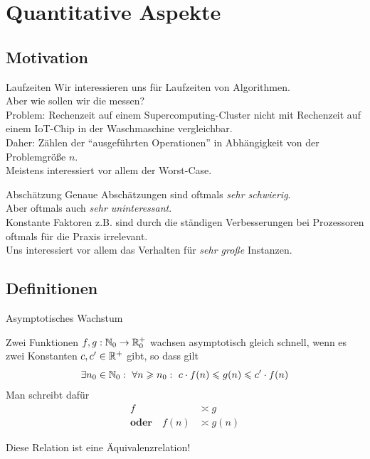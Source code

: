 \section{Quantitative Aspekte}


\subsection{Motivation}
\begin{frame}{Laufzeiten}
	Wir interessieren uns für Laufzeiten von Algorithmen.\\
	Aber wie sollen wir die messen?\\ \pause
	Problem: Rechenzeit auf einem Supercomputing-Cluster nicht mit Rechenzeit auf einem IoT-Chip in der Waschmaschine vergleichbar.\\
	
	\bigskip \pause
	Daher: Zählen der \enquote{ausgeführten Operationen} in Abhängigkeit von der Problemgröße $n$.\\
	Meistens interessiert vor allem der Worst-Case.
\end{frame}

\begin{frame}{Abschätzung}
	Genaue Abschätzungen sind oftmals \textit{sehr schwierig}.\\
	Aber oftmals auch \textit{sehr uninteressant}.\\
	Konstante Faktoren z.B. sind durch die ständigen Verbesserungen bei Prozessoren oftmals für die Praxis irrelevant.\\
	
	\bigskip \pause
	Uns interessiert vor allem das Verhalten für \textit{sehr große} Instanzen.
\end{frame}


\subsection{Definitionen}
\begin{frame}{Asymptotisches Wachstum}
	\begin{Definition}
		Zwei Funktionen $f,g: \mathbb{N}_0 \to \mathbb{R}_0^+$ wachsen asymptotisch gleich schnell, wenn es zwei Konstanten $c, c' \in \mathbb{R}^+$ gibt, so dass gilt $$\exists n_0 \in \mathbb{N}_0: \ \forall n \geqslant n_0: \ c \cdot f(n) \leqslant g(n) \leqslant c' \cdot f(n) $$
		Man schreibt dafür 
		\begin{align*}
			f &\asymp g \\
			\textbf{oder} \quad f(n) &\asymp g(n) 
		\end{align*}
	\end{Definition} \pause
	Diese Relation ist eine Äquivalenzrelation!
\end{frame}

